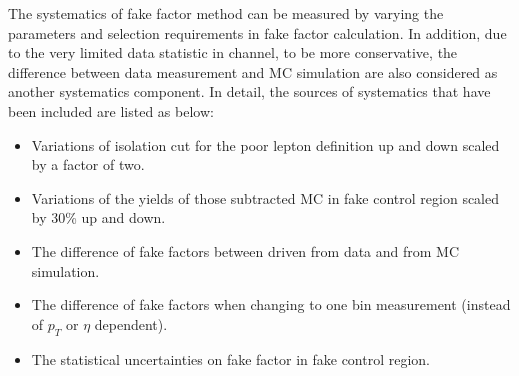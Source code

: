 The systematics of fake factor method can be measured by varying the parameters and selection requirements in fake factor calculation.
In addition, due to the very limited data statistic in \llll channel, to be more conservative, 
the difference between data measurement and MC simulation are also considered as another systematics component.
In detail, the sources of systematics that have been included are listed as below:
\begin{itemize}
	\item Variations of isolation cut for the poor lepton definition up and down scaled by a factor of two.
	\item Variations of the yields of those subtracted MC in fake control region scaled by 30\% up and down.
	\item The difference of fake factors between driven from data and from MC simulation.
	\item The difference of fake factors when changing to one bin measurement (instead of $p_{T}$ or $\eta$ dependent).
	\item The statistical uncertainties on fake factor in fake control region.
\end{itemize}

